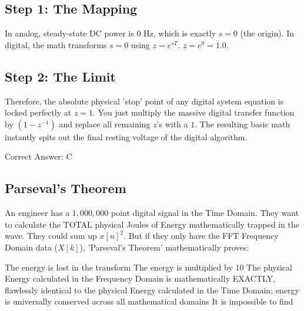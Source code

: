 \begin{solution}

\subsection*{Step 1: The Mapping}
In analog, steady-state DC power is $0\text{ Hz}$, which is exactly $s=0$ (the origin). In digital, the math transforms $s=0$ using $z = e^{sT}$. $z = e^0 = 1.0$.

\subsection*{Step 2: The Limit}
Therefore, the absolute physical 'stop' point of any digital system equation is locked perfectly at $z=1$. You just multiply the massive digital transfer function by $(1 - z^{-1})$ and replace all remaining $z$'s with a $1$. The resulting basic math instantly spits out the final resting voltage of the digital algorithm.

Correct Answer: C
\end{solution}

\clearpage

\subsection{Parseval's Theorem}

An engineer has a $1,000,000$ point digital signal in the Time Domain. They want to calculate the TOTAL physical Joules of Energy mathematically trapped in the wave. They could sum up $x[n]^2$. But if they only have the FFT Frequency Domain data ($X[k]$), 'Parseval's Theorem' mathematically proves:

\begin{choices}
    \choice The energy is lost in the transform
    \choice The energy is multiplied by 10
    \correctchoice The physical Energy calculated in the Frequency Domain is mathematically EXACTLY, flawlessly identical to the physical Energy calculated in the Time Domain; energy is universally conserved across all mathematical domains
    \choice It is impossible to find
\end{choices}

